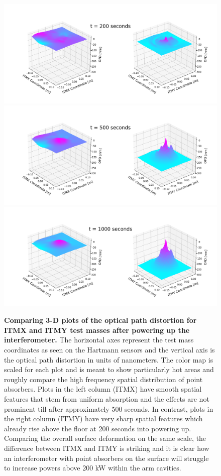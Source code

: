 	 \begin{figure}[t!]
	 	\centering
	 	\includegraphics[width=0.4\textheight]{../Figures/1231726400_3d_200dur_30W_ITM.png}\quad
	 	\includegraphics[width=0.4\textheight]{../Figures/1231726400_3d_500dur_30W_ITM.png}\quad
	 	\includegraphics[width=0.4\textheight]{../Figures/1231726400_3d_1000dur_30W_ITM.png}\quad
	 	\caption[Comparing 3-D plots of the optical path distortion for ITMX and ITMY test masses after powering up the interferometer.]  
	 	{\textbf{Comparing 3-D plots of the optical path distortion for ITMX and ITMY test masses after powering up the interferometer.}
	 		The horizontal axes represent the test mass coordinates as seen on the Hartmann sensors and the vertical axis is the optical path distortion in units of nanometers. The color map is scaled for each plot and is meant to show particularly hot areas and roughly compare the high frequency spatial distribution of point absorbers. Plots in the left column (ITMX) have smooth spatial features that stem from uniform absorption and the effects are not prominent till after approximately 500 seconds.  In contrast, plots in the right column (ITMY) have very sharp spatial features which already rise above the floor at 200 seconds into powering up.  Comparing the overall surface deformation on the same scale, the difference between ITMX and ITMY is striking and it is clear how an interferometer with point absorbers on the surface will struggle to increase powers above 200 kW within the arm cavities.
}
\end{figure}
